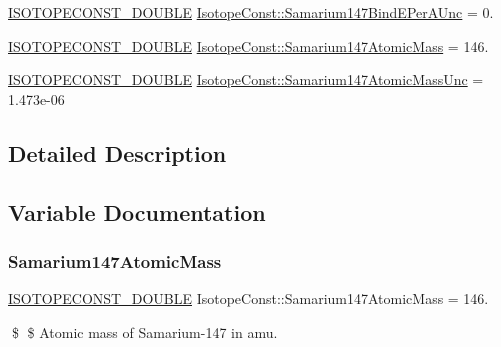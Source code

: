 \begin{DoxyCompactItemize}
\mbox{\hyperlink{group___isotope_const-_macros_ga8f45a7272ce02c0b4c65c44636ed719a}{I\+S\+O\+T\+O\+P\+E\+C\+O\+N\+S\+T\+\_\+\+D\+O\+U\+B\+LE}} \mbox{\hyperlink{group___isotope_const-_samarium-_sm147_ga2b580c612fc81805ffc65fa0b0326c62}{Isotope\+Const\+::\+Samarium147\+Bind\+E\+Per\+A\+Unc}} = 0.
\item 
\mbox{\hyperlink{group___isotope_const-_macros_ga8f45a7272ce02c0b4c65c44636ed719a}{I\+S\+O\+T\+O\+P\+E\+C\+O\+N\+S\+T\+\_\+\+D\+O\+U\+B\+LE}} \mbox{\hyperlink{group___isotope_const-_samarium-_sm147_ga07ee91ec8015c3886ba699ef152f07b5}{Isotope\+Const\+::\+Samarium147\+Atomic\+Mass}} = 146.
\item 
\mbox{\hyperlink{group___isotope_const-_macros_ga8f45a7272ce02c0b4c65c44636ed719a}{I\+S\+O\+T\+O\+P\+E\+C\+O\+N\+S\+T\+\_\+\+D\+O\+U\+B\+LE}} \mbox{\hyperlink{group___isotope_const-_samarium-_sm147_gaf16c5cdb58e70ac93b3ab7f68d77c672}{Isotope\+Const\+::\+Samarium147\+Atomic\+Mass\+Unc}} = 1.\+473e-\/06
\end{DoxyCompactItemize}


\subsection{Detailed Description}


\subsection{Variable Documentation}
\mbox{\label{group___isotope_const-_samarium-_sm147_ga07ee91ec8015c3886ba699ef152f07b5}} 
\subsubsection{\texorpdfstring{Samarium147\+Atomic\+Mass}{Samarium147AtomicMass}}
{\footnotesize\ttfamily \mbox{\hyperlink{group___isotope_const-_macros_ga8f45a7272ce02c0b4c65c44636ed719a}{I\+S\+O\+T\+O\+P\+E\+C\+O\+N\+S\+T\+\_\+\+D\+O\+U\+B\+LE}} Isotope\+Const\+::\+Samarium147\+Atomic\+Mass = 146.}

\$ \$ Atomic mass of Samarium-\/147 in amu. \mbox{\label{group___isotope_const-_samarium-_sm147_gaf16c5cdb58e70ac93b3ab7f68d77c672}} 
